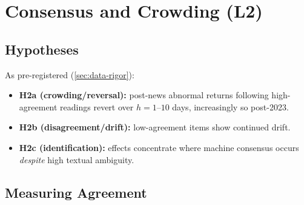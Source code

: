 %
%
%
\chapter{Consensus and Crowding (L2)}
\label{ch:layer2}

\section{Hypotheses}
\label{sec:l2-hypotheses}

As pre-registered (\cref{sec:data-rigor}):
\begin{itemize}
  \item \textbf{H2a (crowding/reversal):} post-news abnormal returns
        following high-agreement readings revert over $h = 1$--$10$
        days, increasingly so post-2023.
  \item \textbf{H2b (disagreement/drift):} low-agreement items show
        continued drift.
  \item \textbf{H2c (identification):} effects concentrate where
        machine consensus occurs \emph{despite} high textual
        ambiguity.
\end{itemize}

\section{Measuring Agreement}
\label{sec:l2-agreement}


